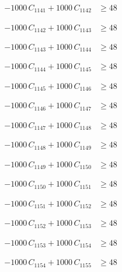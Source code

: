\documentclass[a4paper,11pt]{article}
\begin{document}
\begin{align}
-1000\,C_{1141} + 1000\,C_{1142} &\geq 48 \nonumber
\end{align}

\begin{align}
-1000\,C_{1142} + 1000\,C_{1143} &\geq 48 \nonumber
\end{align}

\begin{align}
-1000\,C_{1143} + 1000\,C_{1144} &\geq 48 \nonumber
\end{align}

\begin{align}
-1000\,C_{1144} + 1000\,C_{1145} &\geq 48 \nonumber
\end{align}

\begin{align}
-1000\,C_{1145} + 1000\,C_{1146} &\geq 48 \nonumber
\end{align}

\begin{align}
-1000\,C_{1146} + 1000\,C_{1147} &\geq 48 \nonumber
\end{align}

\begin{align}
-1000\,C_{1147} + 1000\,C_{1148} &\geq 48 \nonumber
\end{align}

\begin{align}
-1000\,C_{1148} + 1000\,C_{1149} &\geq 48 \nonumber
\end{align}

\begin{align}
-1000\,C_{1149} + 1000\,C_{1150} &\geq 48 \nonumber
\end{align}

\begin{align}
-1000\,C_{1150} + 1000\,C_{1151} &\geq 48 \nonumber
\end{align}

\begin{align}
-1000\,C_{1151} + 1000\,C_{1152} &\geq 48 \nonumber
\end{align}

\begin{align}
-1000\,C_{1152} + 1000\,C_{1153} &\geq 48 \nonumber
\end{align}

\begin{align}
-1000\,C_{1153} + 1000\,C_{1154} &\geq 48 \nonumber
\end{align}

\begin{align}
-1000\,C_{1154} + 1000\,C_{1155} &\geq 48 \nonumber
\end{align}
\end{document}
